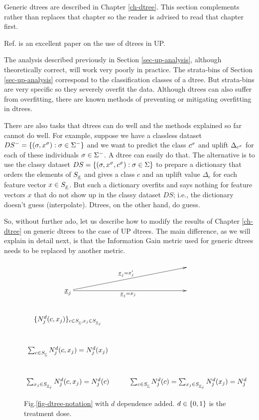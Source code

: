 Generic dtrees are 
described in Chapter \ref{ch-dtree}.
This section 
complements rather than replaces
that chapter so the reader
is advised to read
that chapter first.

Ref.\cite{jaros} is an excellent paper on the use of
dtrees in UP.


The
analysis described
previously in  
Section
\ref{sec-up-analysis},
although theoretically correct,
will work very poorly in practice.
The strata-bins
of Section
\ref{sec-up-analysis}
correspond to
the classification
classes of a dtree.
But strata-bins are very
specific so they  
severely overfit the data.
Although dtrees 
can also suffer from overfitting,
there are known methods of 
preventing or mitigating overfitting in dtrees.

There are also tasks 
that dtrees 
can do well
and the methods
explained so far
cannot do well.
For example,
suppose we have 
a classless
dataset $DS^-=\{(\sigma, x^\sigma):\sigma\in \Sigma^-\}$
and we want to predict
the class $c^\sigma$ and
uplift $\Delta_{c^\sigma}$
for each of these individuals 
$\sigma\in \Sigma^-$.
A dtree can easily
do that. The alternative
is to use the classy dataset 
$DS=\{(\sigma, x^\sigma, c^\sigma):\sigma\in \Sigma\}$
to
prepare a dictionary
that orders
the elements
of $S_\rvx$ and gives a
class $c$ and an uplift value
$\Delta_c$ for each
feature vector $x\in S_\rvx$.
But
such a dictionary overfits
and says nothing for 
feature vectors $x$
that do not show up in 
the classy dataset $DS$; i.e., the
dictionary 
doesn't guess (interpolate). Dtrees,
on the other hand, do
guess.

So, without further ado,
let us describe how to
modify the results
of Chapter \ref{ch-dtree}
on generic dtrees
to the case of UP dtrees.
The main difference,
as we will
explain in detail
next,
is that the Information
Gain metric
used for generic dtrees
needs to be replaced
by another metric.






\begin{figure}[h!]
$$
\xymatrix{
&
\\
\rvx_j\ar[r]_{\rvx_j=x_j}
\ar[ru]^{\rvx_j=x_j'}&
\\
\{N^d_j(c,x_j)\}_{c\in S_\rvc, x_j\in S_{\rvx_j}}
\\
\sum_{c\in S_\rvc}N^d_j(c,x_j)=N^d_j(x_j)
\\
\sum_{x_j\in S_{\rvx_j}}N^d_j(c,x_j)=N^d_j(c)
&
\sum_{c\in S_\rvc}N^d_j(c)=
\sum_{x_j\in S_{\rvx_j}}N^d_j(x_j)=N^d_j
}
$$
\caption{Fig.\ref{fig-dtree-notation}
 with $d$ dependence added.
$d\in \{0,1\}$
is the treatment dose.
} 
\label{fig-dtree-notation-uplift}
\end{figure}

